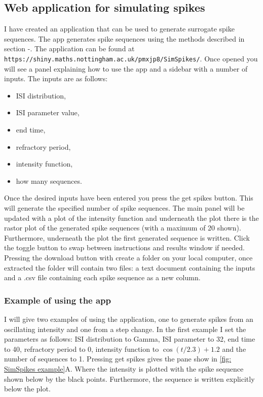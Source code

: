 \documentclass[../main.tex]{subfiles}
\begin{document}
\subsection{Web application for simulating spikes}
I have created an application that can be used to generate surrogate spike sequences. The app generates spike sequences using the methods described in section -. The application can be found at {\tt https://shiny.maths.nottingham.ac.uk/pmxjp8/SimSpikes/}. Once opened you will see a panel explaining how to use the app and a sidebar with a number of inputs. The inputs are as follows:

\begin{itemize}
	\item ISI distribution,
	\item ISI parameter value,
	\item end time,
	\item refractory period,
	\item intensity function,
	\item how many sequences.
\end{itemize}

Once the desired inputs have been entered you press the {get spikes} button. This will generate the specified number of spike sequences. The main panel will be updated with a plot of the intensity function and underneath the plot there is the rastor plot of the generated spike sequences (with a maximum of 20 shown). Furthermore, underneath the plot the first generated sequence is written. Click the toggle button to swap between instructions and results window if needed. Pressing the download button with create a folder on your local computer, once extracted the folder will contain two files: a text document containing the inputs and a {.csv} file containing each spike sequence as a new column. 

\subsubsection{Example of using the app}
I will give two examples of using the application, one to generate spikes from an oscillating intensity and one from a step change. In the first example I set the parameters as follows: ISI distribution to Gamma, ISI parameter to 32, end time to 40, refractory period to 0, intensity function to $\cos \left( t/2.3 \right) +1.2$ and the number of sequences to 1. Pressing get spikes gives the pane show in \ref{fig: SimSpikes example}A. Where the intensity is plotted with the  spike sequence shown below by the black points. Furthermore, the sequence is written explicitly below the plot. 
\end{document}
